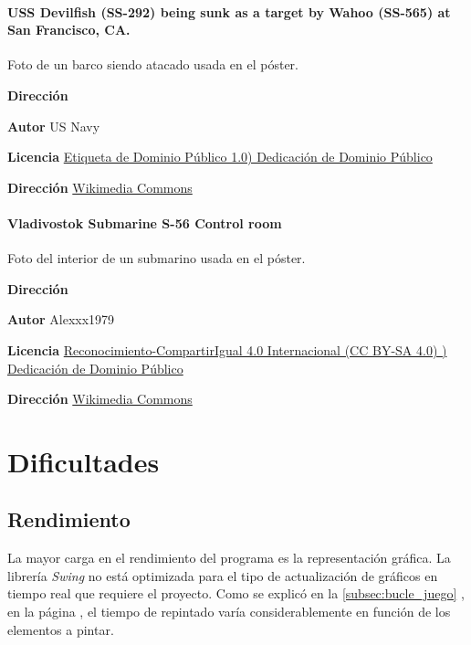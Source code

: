 \documentclass[a4paper,
	11pt,
	parskip=full,
	bibliography=totoc,
	twoside
	]{scrartcl}
\let\oldsection\section
\def\section{\cleardoubleoddpage\oldsection}
\begin{document}
	\paragraph{USS Devilfish (SS-292) being sunk as a target by Wahoo (SS-565) at San Francisco, CA.}
	Foto de un barco siendo atacado usada en el póster.
	\begin{labeling}{\textbf{Dirección}}
		\item[\textbf{Autor}] US Navy
		\item[\textbf{Licencia}] \href{https://creativecommons.org/publicdomain/mark/1.0/deed.es_ES}{Etiqueta de Dominio Público 1.0)
			Dedicación de Dominio Público}
		\item[\textbf{Dirección}]\href{https://commons.wikimedia.org/wiki/File:USS_Devilfish_sunk_as_target_1968.jpg}{Wikimedia Commons}
	\end{labeling}

	\paragraph{Vladivostok Submarine S-56 Control room}
	Foto del interior de un submarino usada en el póster.
	\begin{labeling}{\textbf{Dirección}}
		\item[\textbf{Autor}]  	Alexxx1979
		\item[\textbf{Licencia}] \href{https://creativecommons.org/licenses/by-sa/4.0/deed.es}{Reconocimiento-CompartirIgual 4.0 Internacional (CC BY-SA 4.0) )
			Dedicación de Dominio Público}
		\item[\textbf{Dirección}]\href{https://commons.wikimedia.org/wiki/File:Vladivostok_Submarine_S-56_Control_room_P8050518_2475.jpg}{Wikimedia Commons}
	\end{labeling}
\doublespacing

\section{Dificultades}
\label{sec:dificultades}
	\subsection{Rendimiento}
	\label{subsec:rendimiento}
		La mayor carga en el rendimiento del programa es la representación gráfica. La librería \textit{Swing} no está optimizada para el tipo de actualización de gráficos en tiempo real que requiere el proyecto. Como se explicó en la \autoref{subsec:bucle_juego} , en la página \pageref{subsec:bucle_juego}, el tiempo de repintado varía considerablemente en función de los elementos a pintar.
		
\end{document}
